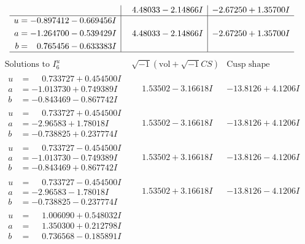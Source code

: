 \documentclass[1p]{elsarticle_modified}
\theoremstyle{definition}
\newcommand{\I}{\sqrt{-1}}
\begin{document}
$$\begin{array}{c|c|c}
 & \phantom{-}4.48033 - 2.14866 I & -2.67250 + 1.35700 I \\ \hline\begin{aligned}
u &= -0.897412 - 0.669456 I \\
a &= -1.264700 - 0.539429 I \\
b &= \phantom{-}0.765456 - 0.633383 I\end{aligned}
 & \phantom{-}4.48033 - 2.14866 I & -2.67250 + 1.35700 I\\
 \hline 
 \end{array}$$\newpage$$\begin{array}{c|c|c}  
\text{Solutions to }I^u_{6}& \I (\text{vol} + \sqrt{-1}CS) & \text{Cusp shape}\\
 \hline 
\begin{aligned}
u &= \phantom{-}0.733727 + 0.454500 I \\
a &= -1.013730 + 0.749389 I \\
b &= -0.843469 - 0.867742 I\end{aligned}
 & \phantom{-}1.53502 - 3.16618 I & -13.8126 + 4.1206 I \\ \hline\begin{aligned}
u &= \phantom{-}0.733727 + 0.454500 I \\
a &= -2.96583 + 1.78018 I \\
b &= -0.738825 + 0.237774 I\end{aligned}
 & \phantom{-}1.53502 - 3.16618 I & -13.8126 + 4.1206 I \\ \hline\begin{aligned}
u &= \phantom{-}0.733727 - 0.454500 I \\
a &= -1.013730 - 0.749389 I \\
b &= -0.843469 + 0.867742 I\end{aligned}
 & \phantom{-}1.53502 + 3.16618 I & -13.8126 - 4.1206 I \\ \hline\begin{aligned}
u &= \phantom{-}0.733727 - 0.454500 I \\
a &= -2.96583 - 1.78018 I \\
b &= -0.738825 - 0.237774 I\end{aligned}
 & \phantom{-}1.53502 + 3.16618 I & -13.8126 - 4.1206 I \\ \hline\begin{aligned}
u &= \phantom{-}1.006090 + 0.548032 I \\
a &= \phantom{-}1.350300 + 0.212798 I \\
b &= \phantom{-}0.736568 - 0.185891 I\end{aligned}

\end{array}$$
\end{document}
